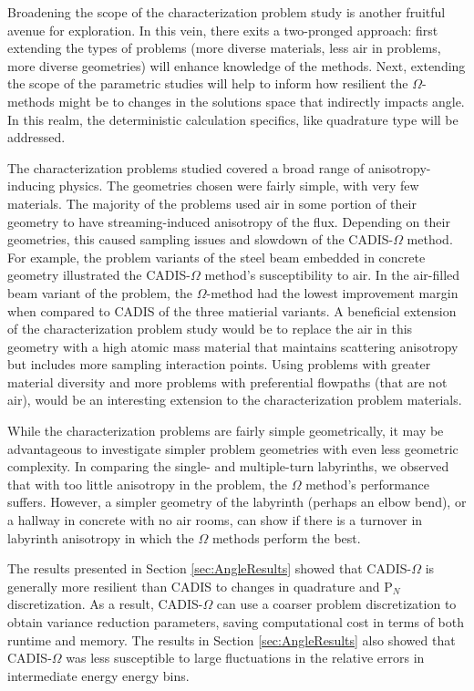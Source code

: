 Broadening the scope
of the characterization problem study
is another fruitful avenue for exploration. In this
vein, there exits a two-pronged approach: first extending the types of problems
(more diverse materials, less air in problems, more diverse geometries) will
enhance knowledge of the methods. Next, extending the scope of the parametric
studies will help to inform how resilient the $\Omega$-methods might be to
changes in the solutions space that indirectly impacts angle.
In this realm, the deterministic calculation specifics, like
quadrature type will be addressed.

The characterization problems studied covered a broad range of
anisotropy-inducing physics. The geometries chosen were fairly
simple, with very few
materials. The majority of the problems used air in some portion of their
geometry to have streaming-induced anisotropy of the flux. Depending on their
geometries, this caused sampling issues and slowdown of the CADIS-$\Omega$ method.
For example, the problem variants of the
steel beam embedded in concrete geometry illustrated the
CADIS-$\Omega$ method's susceptibility to air. In the air-filled beam
variant of the problem, the $\Omega$-method had the lowest improvement margin
when compared to CADIS of the three matierial variants. A
beneficial extension of the characterization problem study would be to replace
the
air in this geometry with a high atomic mass
material that maintains scattering anisotropy but includes more
sampling interaction points. Using problems with greater material diversity
and more problems
with preferential flowpaths (that are not air),
would be an interesting extension
to the characterization problem materials.

While the characterization problems are fairly simple
geometrically, it may be advantageous to
investigate simpler problem geometries with even less
geometric complexity. In
comparing the single- and multiple-turn labyrinths, we observed that with too
little anisotropy in the problem, the $\Omega$ method's performance suffers.
However, a simpler
geometry of the labyrinth (perhaps an elbow bend), or a hallway in concrete with
no air rooms, can show if there is a turnover in labyrinth anisotropy in which
the $\Omega$ methods perform the best.

The results presented in Section \ref{sec:AngleResults} showed that
CADIS-$\Omega$ is generally more resilient than CADIS to changes in
quadrature and P$_N$ discretization.
As a result, CADIS-$\Omega$ can use a coarser problem
discretization to obtain variance reduction parameters, saving
computational cost in terms of both runtime and memory.
The results in Section \ref{sec:AngleResults} also
showed that CADIS-$\Omega$ was less
susceptible to large fluctuations in the relative
errors in intermediate energy energy bins.

